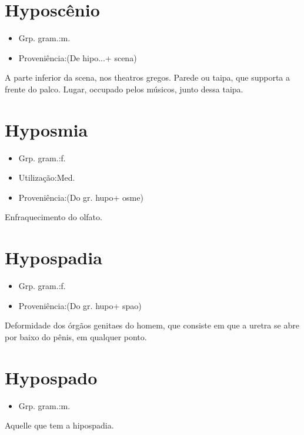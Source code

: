 \documentclass{article}
\begin{document}
\section{Hyposcênio}
\begin{itemize}
\item {Grp. gram.:m.}
\end{itemize}
\begin{itemize}
\item {Proveniência:(De \textunderscore hipo...\textunderscore  + \textunderscore scena\textunderscore )}
\end{itemize}
A parte inferior da scena, nos theatros gregos.
Parede ou taipa, que supporta a frente do palco.
Lugar, occupado pelos músicos, junto dessa taipa.
\section{Hyposmia}
\begin{itemize}
\item {Grp. gram.:f.}
\end{itemize}
\begin{itemize}
\item {Utilização:Med.}
\end{itemize}
\begin{itemize}
\item {Proveniência:(Do gr. \textunderscore hupo\textunderscore  + \textunderscore osme\textunderscore )}
\end{itemize}
Enfraquecimento do olfato.
\section{Hypospadia}
\begin{itemize}
\item {Grp. gram.:f.}
\end{itemize}
\begin{itemize}
\item {Proveniência:(Do gr. \textunderscore hupo\textunderscore  + \textunderscore spao\textunderscore )}
\end{itemize}
Deformidade dos órgãos genitaes do homem, que consiste em que a uretra se abre por baixo do pênis, em qualquer ponto.
\section{Hypospado}
\begin{itemize}
\item {Grp. gram.:m.}
\end{itemize}
Aquelle que tem a hipospadia.
\end{document}
